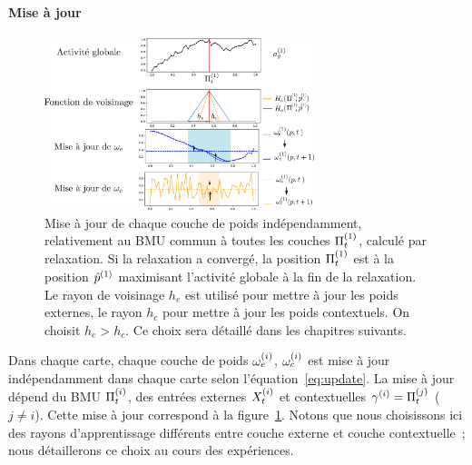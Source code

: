 \documentclass[../main]{subfiles}
\begin{document}
\paragraph{Mise à jour}
\begin{figure}
    \centering
    \includegraphics[width=0.7\textwidth]{maj_2som.pdf}
    \caption{Mise à jour de chaque couche de poids indépendamment, relativement au BMU commun à toutes les couches $\Pi^{({1})}_t$, calculé par relaxation. Si la relaxation a convergé, la position $\Pi^{({1})}_t$ est à la position $\hat{p}^{({1})}$ maximisant l'activité globale à la fin de la relaxation. Le rayon de voisinage $h_e$ est utilisé pour mettre à jour les poids externes, le rayon $h_c$ pour mettre à jour les poids contextuels. On choisit $h_e > h_c$.
    Ce choix sera détaillé dans les chapitres suivants.\label{fig:maj}}
    \end{figure}

Dans chaque carte, chaque couche de poids $\omega_{e}^{({i})}$, $\omega_c^{({i})}$ est mise à jour indépendamment dans chaque carte selon l'équation~\ref{eq:update}. La mise à jour dépend du BMU $\Pi^{({i})}_t$, des entrées externes $X^{({i})}_t$ et contextuelles $\gamma^{({i})} = \Pi^{({j})}_t$ ($j \neq i$). 
Cette mise à jour correspond à la figure~\ref{fig:maj}.
Notons que nous choisissons ici des rayons d'apprentissage différents entre couche externe et couche contextuelle~; nous détaillerons ce choix au cours des expériences.
\end{document}
